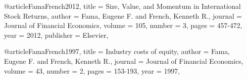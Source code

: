\documentclass[12pt, a4paper]{article}%
\begin{document}
\begin{thebibliography}{1}
@article{FamaFrench2012,
  title = {Size, Value, and Momentum in International Stock Returns},
  author = {Fama, Eugene F. and French, Kenneth R.},
  journal = {Journal of Financial Economics},
  volume = {105},
  number = {3},
  pages = {457-472},
  year = {2012},
  publisher = {Elsevier},
}


@article{FamaFrench1997,
    title = {Industry costs of equity},
    author = {Fama, Eugene F. and French, Kenneth R.},
    journal = {Journal of Financial Economics},
    volume = {43},
    number = {2},
    pages = {153-193},
    year = {1997},
}


\end{thebibliography}
\end{document}
